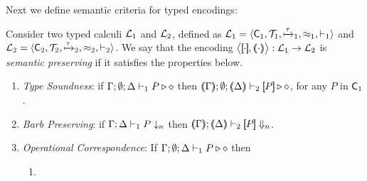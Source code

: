 \documentclass[runningheads]{llncs}
\begin{document}
{{\begin{example}
\end{example}

Next we define semantic criteria for typed encodings:


\begin{definition}%
\label{def:ep}
       Consider two typed calculi $\mathcal{L}_1$ and  $\mathcal{L}_2$, defined as 
        $\mathcal{L}_1=\langle \mathsf{C}_1, {\cal{T}}_1, \xmapsto{\tau}_1, \approx_1, \vdash_1 \rangle$
       and $\mathcal{L}_2=\langle \mathsf{C}_2, {\cal{T}}_2, \xmapsto{\tau}_2, \approx_2, \vdash_2 \rangle$.
We say that the encoding $\enco{\map{\cdot}, \mapt{\cdot}}: \tyl{L}_1 \to \tyl{L}_2$ is \emph{semantic preserving}
if it satisfies the properties below.
	
	\begin{enumerate}[1.]
		\item \emph{Type Soundness}:
	if
	$\Gamma; \emptyset; \Delta \vdash_1 P \triangleright \diamond$ then 
	$\mapt{\Gamma}; \emptyset; \mapt{\Delta} \proves_2 \map{P} \hastype \Proc$,  
	for any   $P$ in $\mathsf{C}_1$.

			\item \emph{Barb Preserving}: if $\Gamma; \Delta \vdash_1 P \downarrow_{n}$
		then $\mapt{\Gamma}; \mapt{\Delta} \proves_2 \map{P} \Barb{n}$.

	\item \emph{Operational Correspondence}: If $\Gamma; \emptyset; \Delta \vdash_1 P \triangleright \diamond$ then
		\begin{enumerate}
			\item	{}
				

\end{enumerate}
\end{enumerate}
\end{definition}}}
\end{document}
